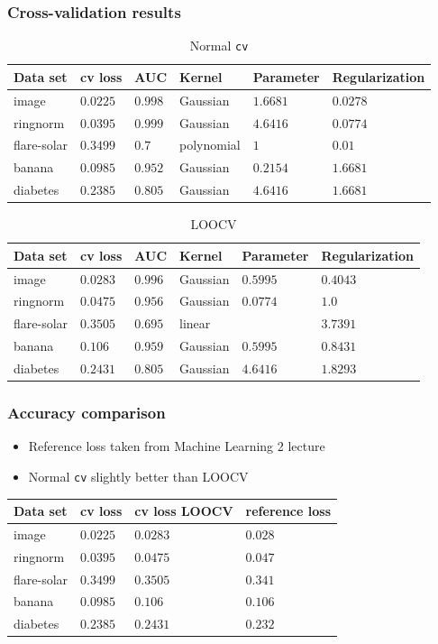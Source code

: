 \begin{frame}
	\small
	\frametitle{Cross-validation results}
	\begin{table}
		\centering
		\caption{Normal \texttt{cv}}
		\begin{tabular}{llllll}
		Data set& cv loss & AUC & Kernel & Parameter& Regularization\\
		\hline
		image & $0.0225$ & $0.998$ & Gaussian & $1.6681$& $0.0278$\\
		ringnorm & $0.0395$& $0.999$ &Gaussian & $4.6416$& $0.0774$\\
		flare-solar & $0.3499$& $0.7$& polynomial& $1$ & $0.01$\\
		banana & $0.0985$& $0.952$& Gaussian & $0.2154$ & $1.6681$\\
		diabetes & $0.2385$ & $0.805$ & Gaussian& $4.6416$& $1.6681$
		\end{tabular}
	\end{table}
	
	\begin{table}
		\centering
		\caption{LOOCV}
		\begin{tabular}{llllll}
		Data set& cv loss& AUC & Kernel & Parameter& Regularization\\
		\hline
		image & $0.0283$& $0.996$ & Gaussian & $0.5995$& $0.4043$\\
		ringnorm & $0.0475$& $0.956$ & Gaussian & $0.0774$& $1.0$\\
		flare-solar & $0.3505$& $0.695$& linear&  & $3.7391$\\
		banana & $0.106$& $0.959$ & Gaussian & $0.5995$ & $0.8431$\\
		diabetes & $0.2431$ &  $0.805$ & Gaussian& $4.6416$& $1.8293$
		\end{tabular}
		
	\end{table}
\end{frame}

\begin{frame}
	\frametitle{Accuracy comparison}
	\begin{itemize}
		\item Reference loss taken from Machine Learning 2 lecture
		\item Normal \texttt{cv} slightly better than LOOCV
	\end{itemize}
	\begin{table}
		\centering
		\begin{tabular}{llll}
			Data set & cv loss & cv loss LOOCV & reference loss\\
			\hline
			image & $0.0225$ & $0.0283$ & $0.028$\\
			ringnorm & $0.0395$ & $0.0475$ & $0.047$ \\
			flare-solar & $0.3499$ & $0.3505$ & $0.341$\\
			banana & $0.0985$ & $0.106$ & $0.106$ \\
			diabetes & $0.2385$ & $0.2431$ & $0.232$
		\end{tabular}
	\end{table}
\end{frame}


